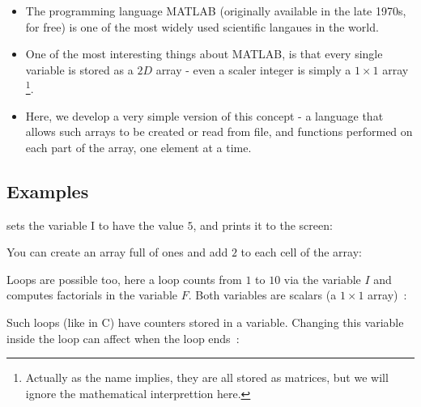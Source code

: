
\begin{itemize}
\item The programming language MATLAB (originally available in the late
1970s, for free) is one of the most widely used scientific langaues in
the world.
\item One of the most interesting things about MATLAB, is that every
single variable is stored as a $2D$ array - even a scaler integer
is simply a $1\times1$ array \footnote{Actually as the name implies,
they are all stored as matrices, but we will ignore the mathematical
interprettion here.}.
\item Here, we develop a very simple version of this concept - a language
that allows such arrays to be created or read from file, and functions performed
on each part of the array, one element at a time.
\end{itemize}

\subsection*{Examples}



sets the variable I to have the value $5$, and prints it to the screen:





You can create an array full of ones and add $2$ to each cell of the array:





Loops are possible too, here a loop counts from $1$ to $10$ via the variable $I$ and computes factorials in the variable $F$. Both variables are scalars (a $1\times1$ array)~:




Such loops (like in C) have counters stored in a variable. Changing this variable inside the loop can affect when the loop ends~:


